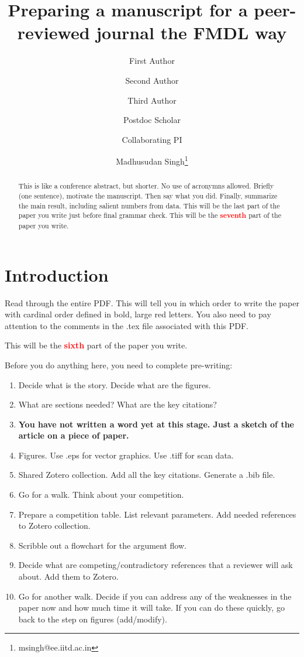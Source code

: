 \documentclass[12 pt]{article}
\title{Preparing a manuscript for a peer-reviewed journal the FMDL way}
\author[1]{\small First Author} %
\author[2]{\small Second Author}  %
\author[1]{\small Third Author}  %
\author[1]{\small Postdoc Scholar}  %
\author[2]{\small Collaborating PI}  %
\author[1]{\small Madhusudan Singh\thanks{msingh@ee.iitd.ac.in}}  %
\affil[1]{\footnotesize Functional Materials \& Devices Laboratory, Department of Electrical Engineering, IIT Delhi, New Delhi, NCT, India, 110 016.} %
\affil[2]{\footnotesize Department of Chemistry, IIT Delhi, New Delhi, NCT, India, 110 016.} %
\date{}
\begin{document}
\maketitle
\begin{abstract}
This is like a conference abstract, but shorter. No use of acronymns allowed. Briefly (one sentence), motivate the manuscript. Then say what you did. Finally, summarize the main result, including salient numbers from data. This will be the last part of the paper you write just before final grammar check. This will be the \textbf{\Huge \textcolor{red}{seventh}} part of the paper you write.
\end{abstract}

\section{Introduction}
\label{sec:introduction}

Read through the entire PDF. This will tell you in which order to write the paper with cardinal order defined in bold, large red letters. You also need to pay attention to the comments in the .tex file associated with this PDF.

This will be the \textbf{\Huge \textcolor{red}{sixth}} part of the paper you write.

Before you do anything here, you need to complete pre-writing:

\begin{enumerate}
\item Decide what is the story. Decide what are the figures.
\item What are sections needed? What are the key citations?
\item \textbf{You have not written a word yet at this stage. Just a sketch of the article on a piece of paper.}
\item Figures. Use .eps for vector graphics. Use .tiff for scan data.
\item Shared Zotero collection. Add all the key citations. Generate a .bib file.
\item Go for a walk. Think about your competition.
\item Prepare a competition table. List relevant parameters. Add needed references to Zotero collection.
\item Scribble out a flowchart for the argument flow.
\item Decide what are competing/contradictory references that a reviewer will ask about. Add them to Zotero.
\item Go for another walk. Decide if you can address any of the weaknesses in the paper now and how much time it will take. If you can do these quickly, go back to the step on figures (add/modify).
\end{enumerate}
\end{document}
